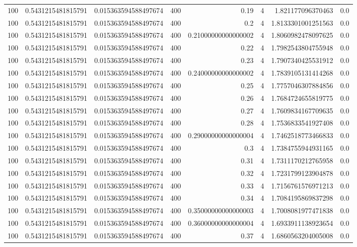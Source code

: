 \documentclass[11pt]{article}
\begin{document}
\begin{center}
\begin{tabular}{rrrrrrrr}
100 & 0.5431215481815791 & 0.015363594588497674 & 400 & 0.19 & 4 & 1.821177096370463 & 0.0\\
100 & 0.5431215481815791 & 0.015363594588497674 & 400 & 0.2 & 4 & 1.8133301001251563 & 0.0\\
100 & 0.5431215481815791 & 0.015363594588497674 & 400 & 0.21000000000000002 & 4 & 1.8060982478097625 & 0.0\\
100 & 0.5431215481815791 & 0.015363594588497674 & 400 & 0.22 & 4 & 1.7982543804755948 & 0.0\\
100 & 0.5431215481815791 & 0.015363594588497674 & 400 & 0.23 & 4 & 1.7907340425531912 & 0.0\\
100 & 0.5431215481815791 & 0.015363594588497674 & 400 & 0.24000000000000002 & 4 & 1.7839105131414268 & 0.0\\
100 & 0.5431215481815791 & 0.015363594588497674 & 400 & 0.25 & 4 & 1.7757046307884856 & 0.0\\
100 & 0.5431215481815791 & 0.015363594588497674 & 400 & 0.26 & 4 & 1.7684724655819775 & 0.0\\
100 & 0.5431215481815791 & 0.015363594588497674 & 400 & 0.27 & 4 & 1.7609834167709635 & 0.0\\
100 & 0.5431215481815791 & 0.015363594588497674 & 400 & 0.28 & 4 & 1.7536833541927408 & 0.0\\
100 & 0.5431215481815791 & 0.015363594588497674 & 400 & 0.29000000000000004 & 4 & 1.7462518773466833 & 0.0\\
100 & 0.5431215481815791 & 0.015363594588497674 & 400 & 0.3 & 4 & 1.7384755944931165 & 0.0\\
100 & 0.5431215481815791 & 0.015363594588497674 & 400 & 0.31 & 4 & 1.7311170212765958 & 0.0\\
100 & 0.5431215481815791 & 0.015363594588497674 & 400 & 0.32 & 4 & 1.7231799123904878 & 0.0\\
100 & 0.5431215481815791 & 0.015363594588497674 & 400 & 0.33 & 4 & 1.7156761576971213 & 0.0\\
100 & 0.5431215481815791 & 0.015363594588497674 & 400 & 0.34 & 4 & 1.7084195869837298 & 0.0\\
100 & 0.5431215481815791 & 0.015363594588497674 & 400 & 0.35000000000000003 & 4 & 1.7008081977471838 & 0.0\\
100 & 0.5431215481815791 & 0.015363594588497674 & 400 & 0.36000000000000004 & 4 & 1.6933911138923654 & 0.0\\
100 & 0.5431215481815791 & 0.015363594588497674 & 400 & 0.37 & 4 & 1.6860563204005008 & 0.0\\

\end{tabular}
\end{center}
\end{document}
